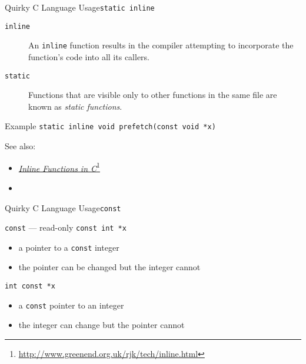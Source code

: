 \begin{frame}[fragile=singleslide]{Quirky C Language Usage}{\texttt{static inline}}
  \begin{description}
  \item[\texttt{inline}] An \texttt{inline} function results in the compiler attempting to
    incorporate the function's code into all its callers.
  \item[\texttt{static}] Functions that are visible only to other functions in the same file
    are known as \emph{static functions}.
  \end{description}
  \begin{block}{Example}
    \texttt{static inline void prefetch(const void *x)}
  \end{block}
\end{frame}

See also:
\begin{itemize}
\item \href{http://www.greenend.org.uk/rjk/tech/inline.html}{\emph{Inline Functions in C}}\footnote{\url{http://www.greenend.org.uk/rjk/tech/inline.html}}
\item {}
\end{itemize}

\begin{frame}{Quirky C Language Usage}{\texttt{const}}
  \begin{block}{\texttt{const} --- read-only}
    \texttt{const int *x}
    \begin{itemize}
    \item a pointer to a \texttt{const} integer
    \item the pointer can be changed but the integer cannot
    \end{itemize}
    \texttt{int const *x}
    \begin{itemize}
    \item a \texttt{const} pointer to an integer
    \item the integer can change but the pointer cannot
    \end{itemize}
  \end{block}
\end{frame}

